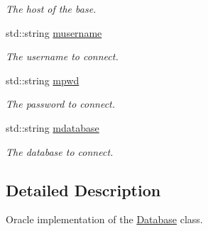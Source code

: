 \begin{DoxyCompactItemize}
\begin{DoxyCompactList}\small\item\em The host of the base. \item\end{DoxyCompactList}\item 
\hypertarget{classOracleDatabase_a2377bf882e2086afa2defe873c2560b2}{
std::string \hyperlink{classOracleDatabase_a2377bf882e2086afa2defe873c2560b2}{musername}}
\label{classOracleDatabase_a2377bf882e2086afa2defe873c2560b2}

\begin{DoxyCompactList}\small\item\em The username to connect. \item\end{DoxyCompactList}\item 
\hypertarget{classOracleDatabase_a19613d7c0f3e400a8145e996e96962cb}{
std::string \hyperlink{classOracleDatabase_a19613d7c0f3e400a8145e996e96962cb}{mpwd}}
\label{classOracleDatabase_a19613d7c0f3e400a8145e996e96962cb}

\begin{DoxyCompactList}\small\item\em The password to connect. \item\end{DoxyCompactList}\item 
\hypertarget{classOracleDatabase_aa976189ee2c8b9ee6431c4893b39d8da}{
std::string \hyperlink{classOracleDatabase_aa976189ee2c8b9ee6431c4893b39d8da}{mdatabase}}
\label{classOracleDatabase_aa976189ee2c8b9ee6431c4893b39d8da}

\begin{DoxyCompactList}\small\item\em The database to connect. \item\end{DoxyCompactList}\end{DoxyCompactItemize}


\subsection{Detailed Description}
Oracle implementation of the \hyperlink{classDatabase}{Database} class. 


